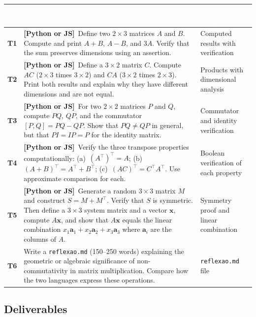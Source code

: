 \documentclass[a4paper,11pt]{article}
\newcommand{\bothlabel}{\textcolor{ippblue}{\textbf{[Python or JS]}}}
\begin{document}
\renewcommand{\arraystretch}{1.3}
\begin{tabularx}{\textwidth}{
  >{\centering\bfseries\cellcolor{lightblue}}p{0.8cm}
  X
  p{3.5cm}
}
\toprule
\rowcolor{ippblue}
\textcolor{white}{\#} & \textcolor{white}{\textbf{Task Description}} & \textcolor{white}{\textbf{Expected Output}} \\
\midrule
T1 & \bothlabel\ Define two $2 \times 3$ matrices $A$ and $B$. Compute and print $A + B$, $A - B$, and $3A$. Verify that the sum preserves dimensions using an assertion. & Computed results with verification \\
\rowcolor{lightgray}
T2 & \bothlabel\ Define a $3 \times 2$ matrix $C$. Compute $AC$ ($2 \times 3$ times $3 \times 2$) and $CA$ ($3 \times 2$ times $2 \times 3$). Print both results and explain why they have different dimensions and are not equal. & Products with dimensional analysis \\
T3 & \bothlabel\ For two $2 \times 2$ matrices $P$ and $Q$, compute $PQ$, $QP$, and the commutator $[P,Q] = PQ - QP$. Show that $PQ \neq QP$ in general, but that $PI = IP = P$ for the identity matrix. & Commutator and identity verification \\
\rowcolor{lightgray}
T4 & \bothlabel\ Verify the three transpose properties computationally: (a)~$(A^\top)^\top = A$; (b)~$(A+B)^\top = A^\top + B^\top$; (c)~$(AC)^\top = C^\top A^\top$. Use approximate comparison for each. & Boolean verification of each property \\
T5 & \bothlabel\ Generate a random $3 \times 3$ matrix $M$ and construct $S = M + M^\top$. Verify that $S$ is symmetric. Then define a $3 \times 3$ system matrix and a vector $\mathbf{x}$, compute $A\mathbf{x}$, and show that $A\mathbf{x}$ equals the linear combination $x_1 \mathbf{a}_1 + x_2 \mathbf{a}_2 + x_3 \mathbf{a}_3$ where $\mathbf{a}_i$ are the columns of $A$. & Symmetry proof and linear combination \\
\rowcolor{lightgray}
T6 & Write a \texttt{reflexao.md} (150--250 words) explaining the geometric or algebraic significance of non-commutativity in matrix multiplication. Compare how the two languages express these operations. & \texttt{reflexao.md} file \\
\bottomrule
\end{tabularx}

\subsection{Deliverables}
\end{document}
